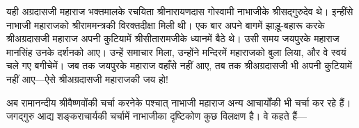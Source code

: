 \begin{sloppypar}\justifying{}
यही अग्रदासजी महाराज भक्तमालके रचयिता श्रीनारायणदास गोस्वामी नाभाजीके श्रीसद्गुरुदेव थे। इन्हींसे नाभाजी महाराजको श्रीराममन्त्रकी विरक्तदीक्षा मिली थी। एक बार अपने बागमें झाड़ू-बहारू करके श्रीअग्रदासजी महाराज अपनी कुटियामें श्रीसीता\-रामजीके ध्यानमें बैठे थे। उसी समय जयपुरके महाराज मानसिंह उनके दर्शनको आए। उन्हें समाचार मिला, उन्होंने मन्दिरमें महाराजको बुला लिया, और वे स्वयं चले गए बगीचेमें। जब तक जयपुरके महाराज वहाँसे नहीं आए, तब तक श्रीअग्रदासजी भी अपनी कुटियामें नहीं आए—ऐसे श्रीअग्रदासजी महाराजकी जय हो!
\end{sloppypar}
\begin{sloppypar}\justifying{}
अब रामानन्दीय श्रीवैष्णवोंकी चर्चा करनेके पश्चात् नाभाजी महाराज अन्य आचार्योंकी भी चर्चा कर रहे हैं। जगद्गुरु आद्य शङ्कराचार्यकी चर्चामें नाभाजीका दृष्टिकोण कुछ विलक्षण है। वे कहते हैं—
\end{sloppypar}


